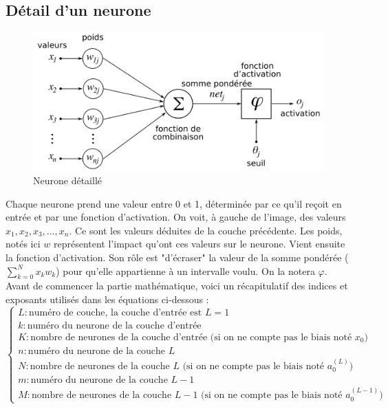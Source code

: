 \subsection{Détail d'un neurone}
	
	\begin{figure}[H]
		\centering
		\includegraphics[width=.75\linewidth]{images/neurone}
		\caption{Neurone détaillé}
	\end{figure}
	
	Chaque neurone prend une valeur entre 0 et 1, déterminée par ce qu'il reçoit en entrée et par une fonction d'activation. On voit, à gauche de l'image, des valeurs $x_1, x_2, x_3, ..., x_n$. Ce sont les valeurs déduites de la couche précédente. Les poids, notés ici $w$ représentent l'impact qu'ont ces valeurs sur le neurone. Vient ensuite la fonction d'activation. Son rôle est "d'écraser" la valeur de la somme pondérée ($\sum_{k=0}^{N}x_kw_{k}$) pour qu'elle appartienne à un intervalle voulu. On la notera $\varphi$.\\
	
	Avant de commencer la partie mathématique, voici un récapitulatif des indices et exposants utilisés dans les équations ci-dessous :
	$$
	\begin{cases}
		L : \text{numéro de couche, la couche d'entrée est $L = 1$}\\
		k : \text{numéro du neurone de la couche d'entrée}\\
		K : \text{nombre de neurones de la couche d'entrée (si on ne compte pas le biais noté $x_0$)}\\
		n : \text{numéro du neurone de la couche $L$}\\
		N : \text{nombre de neurones de la couche $L$ (si on ne compte pas le biais noté $a_0^{(L)}$)}\\
		m : \text{numéro du neurone de la couche $L-1$}\\
		M : \text{nombre de neurones de la couche $L-1$ (si on ne compte pas le biais noté $a_0^{(L-1)}$)}
	\end{cases}
	$$
	
